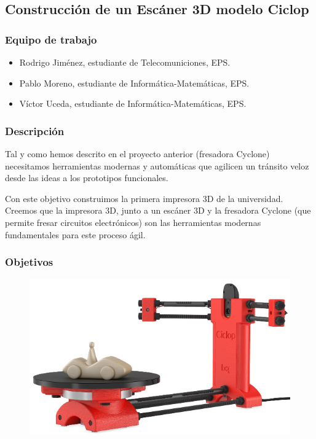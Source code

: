 \documentclass[12pt,twoside]{report}
\begin{document}
\newpage

\subsection{Construcción de un Escáner 3D modelo Ciclop}

\subsubsection{Equipo de trabajo}
\begin{itemize}
\item Rodrigo Jiménez, estudiante de Telecomuniciones, EPS.
\item Pablo Moreno, estudiante de Informática-Matemáticas, EPS.
\item Víctor Uceda, estudiante de Informática-Matemáticas, EPS.
\end{itemize}
\subsubsection{Descripción}
 Tal y como hemos descrito en el proyecto anterior (fresadora Cyclone) necesitamos herramientas modernas y automáticas que agilicen un tránsito veloz desde las ideas a los prototipos funcionales.

Con este objetivo construimos la primera impresora 3D de la universidad. Creemos que la impresora 3D, junto a un escáner 3D y la fresadora Cyclone (que permite fresar circuitos electrónicos) son las herramientas modernas fundamentales para este proceso ágil.

\subsubsection{Objetivos}


\begin{figure}\centering
    \includegraphics[scale=0.4]{fotos/bq-ciclop-1}
    \caption*{}
\end{figure}
\end{document}
